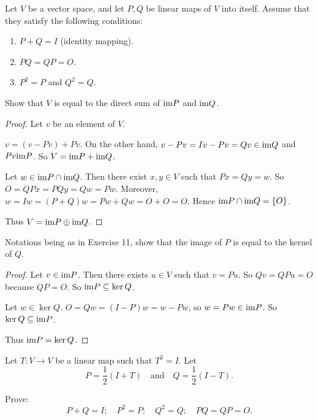 \begin{exercise}
    Let $V$ be a vector space, and let $P, Q$ be linear maps of $V$ into itself. Assume that they satisfy the following conditions:
    \begin{enumerate}[label={(\alph*)}]
        \item $P + Q = I$ (identity mapping).
        \item $PQ = QP = O$.
        \item $P^{2} = P$ and $Q^{2} = Q$.
    \end{enumerate}

    Show that $V$ is equal to the direct sum of $\text{im} P$ and $\text{im} Q$.
\end{exercise}

\begin{proof}
    Let $v$ be an element of $V$.

    $v = (v - Pv) + Pv$. On the other hand, $v - Pv = Iv - Pv = Qv \in \text{im} Q$ and $Pv \text{im} P$. So $V = \text{im} P + \text{im} Q$.

    Let $w\in\text{im} P\cap\text{im} Q$. Then there exist $x, y\in V$ such that $Px = Qy = w$. So $O = QPx = PQy = Qw = Pw$. Moreover, $w = Iw = (P + Q)w = Pw + Qw = O + O = O$. Hence $\text{im} P\cap\text{im} Q = \{ O \}$.

    Thus $V = \text{im} P \oplus \text{im} Q$.
\end{proof}

\begin{exercise}
    Notations being as in Exercise 11, show that the image of $P$ is equal to the kernel of $Q$.
\end{exercise}

\begin{proof}
    Let $v\in\text{im} P$. Then there exists $u\in V$ such that $v = Pu$. So $Qv = QPu = O$ because $QP = O$. So $\text{im} P \subseteq \ker Q$.

    Let $w\in\ker Q$. $O = Qw = (I - P)w = w - Pw$, so $w = Pw\in\text{im} P$. So $\ker Q\subseteq \text{im} P$.

    Thus $\text{im} P = \ker Q$.
\end{proof}

\begin{exercise}
    Let $T: V\to V$ be a linear map such that $T^{2} = I$. Let
    \[
        P = \frac{1}{2}(I + T)\quad\text{and}\quad Q = \frac{1}{2}(I - T).
    \]

    Prove:
    \[
        P + Q = I;\quad P^{2} = P;\quad Q^{2} = Q;\quad PQ = QP = O.
    \]
\end{exercise}

